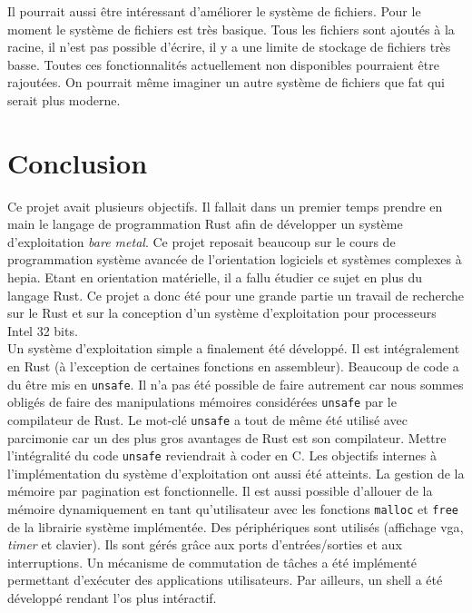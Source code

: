 \documentclass[a4paper, 12pt]{article}
\begin{document}
Il pourrait aussi être intéressant d'améliorer le système de fichiers. Pour le
moment le système de fichiers est très basique. Tous les fichiers sont ajoutés
à la racine, il n'est pas possible d'écrire, il y a une limite de stockage
de fichiers très basse. Toutes ces fonctionnalités actuellement non disponibles
pourraient être rajoutées. On pourrait même imaginer un autre système de fichiers
que \acrshort{fat} qui serait plus moderne.


\newpage
\section{Conclusion}
Ce projet avait plusieurs objectifs. Il fallait dans un premier temps prendre
en main le langage de programmation Rust afin de développer un système d'exploitation
\textit{bare metal}. Ce projet reposait beaucoup sur le cours de programmation
système avancée de l'orientation logiciels et systèmes complexes à hepia. Etant
en orientation matérielle, il a fallu étudier ce sujet en plus du langage Rust.
Ce projet a donc été pour une grande partie un travail de recherche sur le Rust
et sur la conception d'un système d'exploitation pour processeurs Intel 32 bits. \\

Un système d'exploitation simple a finalement été développé. Il est intégralement
en Rust (à l'exception de certaines fonctions en assembleur). Beaucoup
de code a du être mis en \texttt{unsafe}. Il n'a pas été possible de faire
autrement car nous sommes obligés de faire des manipulations mémoires considérées
\texttt{unsafe} par le compilateur de Rust. Le mot-clé \texttt{unsafe}
a tout de même été utilisé avec parcimonie car un des plus gros avantages de Rust
est son compilateur. Mettre l'intégralité du code \texttt{unsafe} reviendrait
à coder en C. Les objectifs internes à l'implémentation du système d'exploitation
ont aussi été atteints. La gestion de la mémoire par pagination est fonctionnelle. 
Il est aussi possible d'allouer de la mémoire dynamiquement en tant qu'utilisateur
avec les fonctions \texttt{malloc} et \texttt{free} de la
librairie système implémentée. Des périphériques sont utilisés (affichage \acrshort{vga},
\textit{timer} et clavier). Ils sont gérés grâce aux ports d'entrées/sorties
et aux interruptions. Un mécanisme de commutation de tâches a été implémenté
permettant d'exécuter des applications utilisateurs. Par ailleurs, un shell
a été développé rendant l'\acrshort{os} plus intéractif. \\
\end{document}
